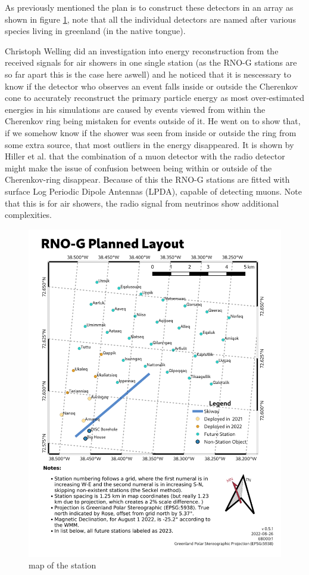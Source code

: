\documentclass[11pt,a4paper,faculty=we,language=en,doctype=report]{cls/ugent-doc}
\begin{document}
As previously mentioned the plan is to construct these detectors in an array as
shown in figure \ref{fig:station map}, note that all the individual detectors
are named after various species living in greenland (in the native tongue).

Christoph Welling did an investigation into energy reconstruction from the
received signals\cite{Welling_2019} for air showers in one single station (as
the RNO-G stations are so far apart this is the case here aswell) and he
noticed that it is nescessary to know if the detector who observes an event
falls inside or outside the Cherenkov cone to accurately reconstruct the
primary particle energy as most over-estimated energies in his simulations are
caused by events viewed from within the Cherenkov ring being mistaken for
events outside of it. He went on to show that, if we somehow know if the shower
was seen from inside or outside the ring from some extra source, that most
outliers in the energy disappeared. It is shown by Hiller et
al.\cite{Hiller_2017} that the combination of a muon detector with the radio
detector might make the issue of confusion between being within or outside of
the Cherenkov-ring disappear. Because of this the RNO-G stations are fitted
with surface Log Periodic Dipole Antennas (LPDA), capable of detecting muons.
Note that this is for air showers, the radio signal from neutrinos show
additional complexities.

\begin{figure}
	\includegraphics[width=\textwidth]{figures/station-map.png}	
	\caption{map of the station}
	\label{fig:station map}
\end{figure}
\end{document}
